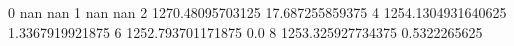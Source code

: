 0 nan nan
1 nan nan
2 1270.48095703125 17.687255859375
4 1254.1304931640625 1.3367919921875
6 1252.793701171875 0.0
8 1253.325927734375 0.5322265625
